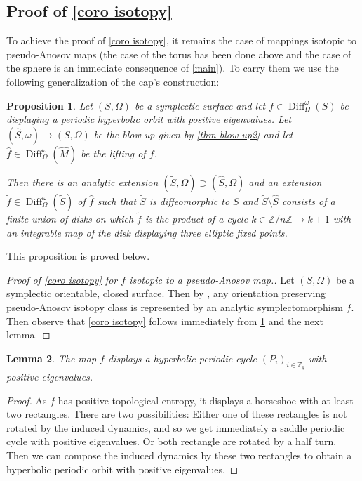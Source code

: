 \documentclass[JEP,XML,SOM,Unicode,NoFloatCountersInSection,Unicode,published]{cedram}
\newcommand\Z{\mathbb Z}
\DeclareMathOperator\Diff{Diff}
\newtheorem{proposition}{Proposition}[section]
\newtheorem{lemma}[proposition] {Lemma}
\theoremstyle{definition}
\begin{document}
\subsection{Proof of \cref{coro isotopy}}\label{S42}
To achieve the proof of \cref{coro isotopy}, it remains the case of mappings isotopic to pseudo-Anosov maps (the case of the torus has been done above and the case of the sphere is an immediate consequence of \cref{main}). To carry them we use the following generalization of the cap's construction:
\begin{proposition}\label{generalized cap}Let $(S,\Omega)$ be a symplectic surface and let $f\in \Diff^\omega_\Omega(S)$ be displaying a periodic hyperbolic orbit with positive eigenvalues.
Let $(\hat S,\omega)\to (S, \Omega)$ be the blow up given by \cref{thm blow-up2} and let $\hat f\in \Diff^\omega_\Omega(\hat M)$ be the lifting of $f$.

Then there is an analytic extension $(\tilde S,\Omega)\supset (\hat S,\Omega)$ and an extension $\tilde f\in \Diff^\omega_\Omega(\tilde S)$ of $\hat f$ such that $\tilde S$ is diffeomorphic to $S$ and $\tilde S\setminus \hat S$ consists of a finite union of disks on which $\tilde f$ is the product of a cycle $k\in \Z/n\Z\to k+1$ with an integrable map of the disk displaying three elliptic fixed points.
\end{proposition}
This proposition is proved below.
\begin{proof}[Proof of \cref{coro isotopy} for $f$ isotopic to a pseudo-Anosov map.]
Let $(S, \Omega)$ be a symplectic orientable, closed surface. Then by \cite{GK82,Ge85}, any orientation preserving pseudo-Anosov isotopy class is represented by an analytic symplectomorphism $f$. Then observe that \cref{coro isotopy} follows immediately from
\cref{generalized cap} and the next lemma. \end{proof}
\begin{lemma}
The map $f$ displays a hyperbolic periodic cycle $(P_i)_{i\in \Z_q}$ with positive eigenvalues.\end{lemma}
\begin{proof}
As $f$ has positive topological entropy, it displays a horseshoe \cite{Ka80} with at least two rectangles. There are two possibilities:
Either one of these rectangles is not rotated by the induced dynamics, and so we get immediately a saddle periodic cycle with positive eigenvalues. Or both rectangle are rotated by a half turn. Then we can compose the induced dynamics by these two rectangles to obtain a hyperbolic periodic orbit with positive eigenvalues.
\end{proof}
\end{document}
